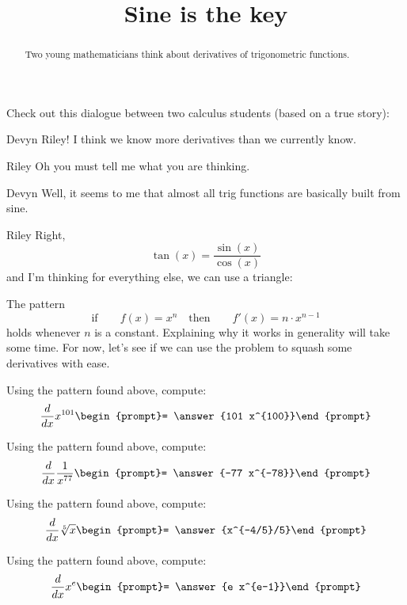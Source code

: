 \documentclass{ximera}
\title[Break-Ground:]{Sine is the key}
\begin{document}
\begin{abstract}
Two young mathematicians think about derivatives of trigonometric functions.
\end{abstract}
\maketitle

Check out this dialogue between two calculus students (based on a true
story):

\begin{dialogue}
\item[Devyn] Riley! I think we know more derivatives than we currently know.
\item[Riley] Oh you must tell me what you are thinking.
\item[Devyn] Well, it seems to me that almost all trig functions are
  basically built from sine.
\item[Riley] Right,
  \[
  \tan(x) = \frac{\sin(x)}{\cos(x)}
  \]
  and I'm thinking for everything else, we can use a triangle:
  
  
\end{dialogue}

The pattern
\[
  \text{if} \qquad f(x) = x^n\quad\text{then}\qquad f'(x) = n\cdot x^{n-1}
\]
holds whenever $n$ is a constant. Explaining why it works in
generality will take some time. For now, let's see if we can use the
problem to squash some derivatives with ease.

\begin{problem}
  Using the pattern found above, compute:
  \[
  \ddx x^{101} \begin{prompt}= \answer{101 x^{100}}\end{prompt}
  \]
\end{problem}

\begin{problem}
  Using the pattern found above, compute:
  \[
  \ddx \frac{1}{x^{77}} \begin{prompt}= \answer{-77 x^{-78}}\end{prompt}
  \]
\end{problem}


\begin{problem}
  Using the pattern found above, compute:
  \[
  \ddx \sqrt[5]{x} \begin{prompt}= \answer{x^{-4/5}/5}\end{prompt}
  \]
\end{problem}

\begin{problem}
  Using the pattern found above, compute:
  \[
  \ddx x^e  \begin{prompt}= \answer{e x^{e-1}}\end{prompt}
  \]
\end{problem}


\end{document}

